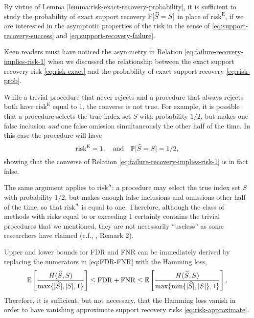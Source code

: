 By virtue of Lemma \ref{lemma:risk-exact-recovery-probability}, it is sufficient to study the probability of exact support recovery $\P[\widehat{S}=S]$ in place of $\mathrm{risk}^{\mathrm{E}}$, if we are interested in the asymptotic properties of the risk in the sense of \eqref{eq:support-recovery-success} and \eqref{eq:support-recovery-failure}.

\medskip

Keen readers must have noticed the asymmetry in Relation \eqref{eq:failure-recovery-implies-risk-1} when we discussed the relationship between the exact support recovery risk \eqref{eq:risk-exact} and the probability of exact support recovery \eqref{eq:risk-prob}.

While a trivial procedure that never rejects and a procedure that always rejects both have $\mathrm{risk}^{\mathrm{E}}$ equal to 1, the converse is not true.
For example, it is possible that a procedure selects the true index set $S$ with probability $1/2$, but makes one false inclusion \emph{and} one false omission simultaneously the other half of the time. 
In this case the procedure will have 
$$\mathrm{risk}^{\mathrm{E}} = 1, \quad \text{and} \quad \P[\widehat{S}=S] = 1/2,$$
showing that the converse of Relation \eqref{eq:failure-recovery-implies-risk-1} is in fact false.

The same argument applies to $\mathrm{risk}^{\mathrm{A}}$:
a procedure may select the true index set $S$ with probability $1/2$, but makes enough false inclusions and omissions other half of the time, so that $\mathrm{risk}^{\mathrm{A}}$ is equal to one.
Therefore, although the class of methods with risks equal to or exceeding 1 certainly contains the trivial procedures that we mentioned, they are not necessarily ``useless'' as some researchers have claimed (c.f., \citet{arias2017distribution}, Remark 2).

\medskip

Upper and lower bounds for \ac{FDR} and \ac{FNR} can be immediately derived by replacing the numerators in \eqref{eq:FDR-FNR} with the Hamming loss,
\begin{equation} \label{eq:Hamming-loss-FDR-FNR-bound}
    \E\left[\frac{H(\widehat{S}, S)}{\max\{|\widehat{S}|, |S|, 1\}}\right] 
    \le \mathrm{FDR} + \mathrm{FNR}
    \le \E\left[\frac{H(\widehat{S}, S)}{\max\{\min\{|\widehat{S}|, |S|\}, 1\}}\right].
\end{equation}
Therefore, it is sufficient, but not necessary, that the Hamming loss vanish in order to have vanishing approximate support recovery risks \eqref{eq:risk-approximate}.

